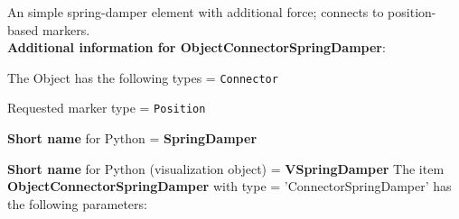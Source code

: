 \label{sec:item:ObjectConnectorSpringDamper}
An simple spring-damper element with additional force; connects to position-based markers.\vspace{12pt}
 \\{\bf Additional information for ObjectConnectorSpringDamper}:
\bi
  \item The Object has the following types = \texttt{Connector}
  \item Requested marker type = \texttt{Position}
  \item {\bf Short name} for Python = {\bf SpringDamper}  \item {\bf Short name} for Python (visualization object) = {\bf VSpringDamper}\ei
\vspace{12pt} \noindent The item {\bf ObjectConnectorSpringDamper} with type = 'ConnectorSpringDamper' has the following parameters:\vspace{-1cm}\\ 
